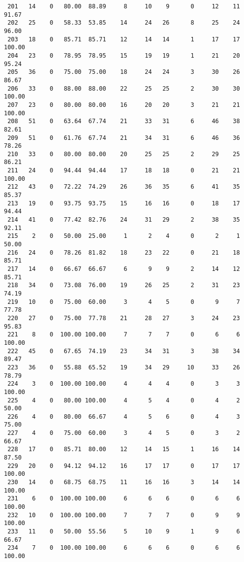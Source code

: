 \begin{verbatim}
 201   14    0   80.00  88.89     8     10    9      0     12    11    91.67
 202   25    0   58.33  53.85    14     24   26      8     25    24    96.00
 203   18    0   85.71  85.71    12     14   14      1     17    17   100.00
 204   23    0   78.95  78.95    15     19   19      1     21    20    95.24
 205   36    0   75.00  75.00    18     24   24      3     30    26    86.67
 206   33    0   88.00  88.00    22     25   25      2     30    30   100.00
 207   23    0   80.00  80.00    16     20   20      3     21    21   100.00
 208   51    0   63.64  67.74    21     33   31      6     46    38    82.61
 209   51    0   61.76  67.74    21     34   31      6     46    36    78.26
 210   33    0   80.00  80.00    20     25   25      2     29    25    86.21
 211   24    0   94.44  94.44    17     18   18      0     21    21   100.00
 212   43    0   72.22  74.29    26     36   35      6     41    35    85.37
 213   19    0   93.75  93.75    15     16   16      0     18    17    94.44
 214   41    0   77.42  82.76    24     31   29      2     38    35    92.11
 215    2    0   50.00  25.00     1      2    4      0      2     1    50.00
 216   24    0   78.26  81.82    18     23   22      0     21    18    85.71
 217   14    0   66.67  66.67     6      9    9      2     14    12    85.71
 218   34    0   73.08  76.00    19     26   25      2     31    23    74.19
 219   10    0   75.00  60.00     3      4    5      0      9     7    77.78
 220   27    0   75.00  77.78    21     28   27      3     24    23    95.83
 221    8    0  100.00 100.00     7      7    7      0      6     6   100.00
 222   45    0   67.65  74.19    23     34   31      3     38    34    89.47
 223   36    0   55.88  65.52    19     34   29     10     33    26    78.79
 224    3    0  100.00 100.00     4      4    4      0      3     3   100.00
 225    4    0   80.00 100.00     4      5    4      0      4     2    50.00
 226    4    0   80.00  66.67     4      5    6      0      4     3    75.00
 227    4    0   75.00  60.00     3      4    5      0      3     2    66.67
 228   17    0   85.71  80.00    12     14   15      1     16    14    87.50
 229   20    0   94.12  94.12    16     17   17      0     17    17   100.00
 230   14    0   68.75  68.75    11     16   16      3     14    14   100.00
 231    6    0  100.00 100.00     6      6    6      0      6     6   100.00
 232   10    0  100.00 100.00     7      7    7      0      9     9   100.00
 233   11    0   50.00  55.56     5     10    9      1      9     6    66.67
 234    7    0  100.00 100.00     6      6    6      0      6     6   100.00

\end{verbatim}
